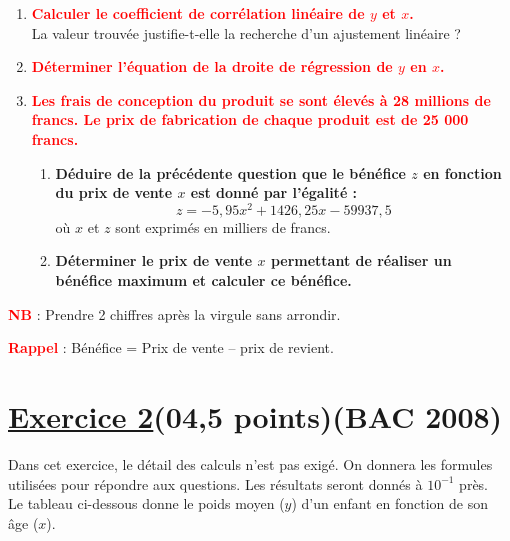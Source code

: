 \documentclass[12pt,a4paper]{article}
\newcounter{exercice}                                   %
\begin{document}
\vspace{0.4cm}

\begin{enumerate}
    \item \textbf{\textcolor{red}{Calculer le coefficient de corrélation linéaire de \( y \) et \( x \).}}\\
    La valeur trouvée justifie-t-elle la recherche d’un ajustement linéaire ?

    \item \textbf{\textcolor{red}{Déterminer l’équation de la droite de régression de \( y \) en \( x \).}}

    \item \textbf{\textcolor{red}{Les frais de conception du produit se sont élevés à 28 millions de francs. Le prix de fabrication de chaque produit est de 25 000 francs.}}

    \begin{enumerate}
        \item \textbf{Déduire de la précédente question que le bénéfice \( z \) en fonction du prix de vente \( x \) est donné par l’égalité :}
        \[
        z = -5{,}95x^2 + 1426{,}25x - 59937{,}5
        \]
        où \( x \) et \( z \) sont exprimés en milliers de francs.

        \item \textbf{Déterminer le prix de vente \( x \) permettant de réaliser un bénéfice maximum et calculer ce bénéfice.}
    \end{enumerate}
\end{enumerate}

\vspace{0.4cm}
\textcolor{red}{\textbf{NB}} : Prendre 2 chiffres après la virgule sans arrondir.

\vspace{0.2cm}
\textcolor{red}{\textbf{Rappel}} : Bénéfice = Prix de vente – prix de revient.
\section*{\underline{Exercice 2}(04,5 points)(BAC 2008)}

Dans cet exercice, le détail des calculs n’est pas exigé. On donnera les formules utilisées pour répondre aux questions. Les résultats seront donnés à \( 10^{-1} \) près.\\
Le tableau ci-dessous donne le poids moyen (\( y \)) d’un enfant en fonction de son âge (\( x \)).

\vspace{0.3cm}
\end{document}
